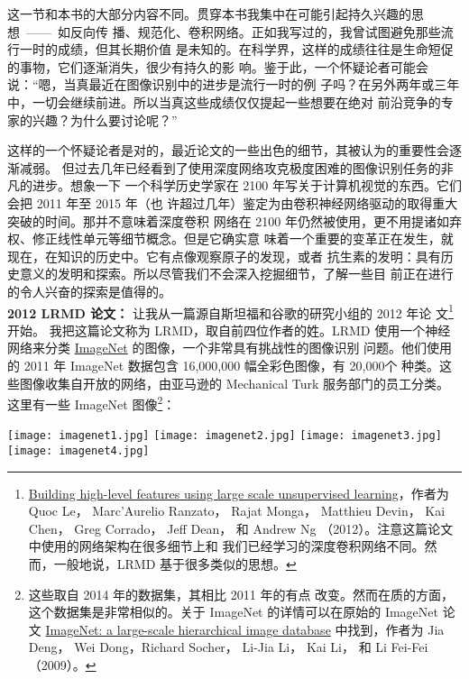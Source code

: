 这一节和本书的大部分内容不同。贯穿本书我集中在可能引起持久兴趣的思想~——~如反向传
播、规范化、卷积网络。正如我写过的，我曾试图避免那些流行一时的成绩，但其长期价值
是未知的。在科学界，这样的成绩往往是生命短促的事物，它们逐渐消失，很少有持久的影
响。鉴于此，一个怀疑论者可能会说：“嗯，当真最近在图像识别中的进步是流行一时的例
子吗？在另外两年或三年中，一切会继续前进。所以当真这些成绩仅仅提起一些想要在绝对
前沿竞争的专家的兴趣？为什么要讨论呢？”

这样的一个怀疑论者是对的，最近论文的一些出色的细节，其被认为的重要性会逐渐减弱。
但过去几年已经看到了使用深度网络攻克极度困难的图像识别任务的非凡的进步。想象一下
一个科学历史学家在 2100 年写关于计算机视觉的东西。它们会把 2011 年至 2015 年（也
  许超过几年）鉴定为由卷积神经网络驱动的取得重大突破的时间。那并不意味着深度卷积
网络在 2100 年仍然被使用，更不用提诸如弃权、修正线性单元等细节概念。但是它确实意
味着一个重要的变革正在发生，就现在，在知识的历史中。它有点像观察原子的发现，或者
抗生素的发明：具有历史意义的发明和探索。所以尽管我们不会深入挖掘细节，了解一些目
前正在进行的令人兴奋的探索是值得的。\\

\textbf{2012 LRMD 论文：} 让我从一篇源自斯坦福和谷歌的研究小组的 2012 年论
文\footnote{\href{http://research.google.com/pubs/pub38115.html}{Building
    high-level features using large scale unsupervised learning}，作者为 Quoc Le，
  Marc'Aurelio Ranzato， Rajat Monga， Matthieu Devin， Kai Chen， Greg Corrado，
  Jeff Dean， 和 Andrew Ng （2012）。注意这篇论文中使用的网络架构在很多细节上和
  我们已经学习的深度卷积网络不同。然而，一般地说，LRMD 基于很多类似的思想。}开始。
我把这篇论文称为 LRMD，取自前四位作者的姓。LRMD 使用一个神经网络来分类
\href{http://www.image-net.org/}{ImageNet} 的图像，一个非常具有挑战性的图像识别
问题。他们使用的 2011 年 ImageNet 数据包含 16,000,000 幅全彩色图像，有 20,000个
种类。这些图像收集自开放的网络，由亚马逊的 Mechanical Turk 服务部门的员工分类。
这里有一些 ImageNet 图像\footnote{这些取自 2014 年的数据集，其相比 2011 年的有点
  改变。然而在质的方面，这个数据集是非常相似的。关于 ImageNet 的详情可以在原始的
  ImageNet 论文 \href{http://www.image-net.org/papers/imagenet_cvpr09.pdf}{
    ImageNet: a large-scale hierarchical image database} 中找到，作者为 Jia Deng，
  Wei Dong，Richard Socher， Li-Jia Li， Kai Li， 和 Li Fei-Fei （2009）。}：

\begin{center}
	\texttt{[image: imagenet1.jpg]}%
	\texttt{[image: imagenet2.jpg]}%
	\texttt{[image: imagenet3.jpg]}%
	\texttt{[image: imagenet4.jpg]}
\end{center}

